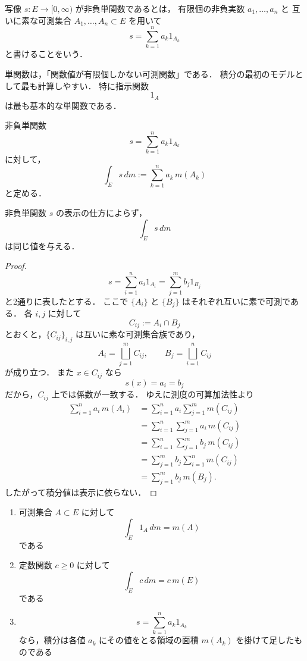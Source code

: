 \begin{definition}[非負単関数]
写像 $s:E \to [0,\infty)$ が非負単関数であるとは，
有限個の非負実数 $a_1,\dots,a_n$ と
互いに素な可測集合 $A_1,\dots,A_n \subset E$ を用いて
\[
s=\sum_{k=1}^n a_k 1_{A_k}
\]
と書けることをいう．
\end{definition}

\begin{remark}
単関数は，「関数値が有限個しかない可測関数」である．
積分の最初のモデルとして最も計算しやすい．
特に指示関数
\[
1_A
\]
は最も基本的な単関数である．
\end{remark}

\begin{definition}[単関数の積分]
非負単関数
\[
s=\sum_{k=1}^n a_k 1_{A_k}
\]
に対して，
\[
\int_E s\,dm
:=
\sum_{k=1}^n a_k\,m(A_k)
\]
と定める．
\end{definition}

\begin{proposition}
非負単関数 $s$ の表示の仕方によらず，
\[
\int_E s\,dm
\]
は同じ値を与える．
\end{proposition}
\begin{proof}
\[
s=\sum_{i=1}^n a_i 1_{A_i}
=
\sum_{j=1}^m b_j 1_{B_j}
\]
と2通りに表したとする．
ここで $\{A_i\}$ と $\{B_j\}$ はそれぞれ互いに素で可測である．
各 $i,j$ に対して
\[
C_{ij}:=A_i \cap B_j
\]
とおくと，$\{C_{ij}\}_{i,j}$ は互いに素な可測集合族であり，
\[
A_i=\bigsqcup_{j=1}^m C_{ij},
\qquad
B_j=\bigsqcup_{i=1}^n C_{ij}
\]
が成り立つ．
また $x \in C_{ij}$ なら
\[
s(x)=a_i=b_j
\]
だから，$C_{ij}$ 上では係数が一致する．
ゆえに測度の可算加法性より
\begin{align*}
\sum_{i=1}^n a_i\,m(A_i)
&=
\sum_{i=1}^n a_i \sum_{j=1}^m m(C_{ij}) \\
&=
\sum_{i=1}^n \sum_{j=1}^m a_i\,m(C_{ij}) \\
&=
\sum_{i=1}^n \sum_{j=1}^m b_j\,m(C_{ij}) \\
&=
\sum_{j=1}^m b_j \sum_{i=1}^n m(C_{ij}) \\
&=
\sum_{j=1}^m b_j\,m(B_j).
\end{align*}
したがって積分値は表示に依らない．
\end{proof}

\begin{example}
\begin{enumerate}
    \item 可測集合 $A \subset E$ に対して
    \[
    \int_E 1_A\,dm = m(A)
    \]
    である
    \item 定数関数 $c \ge 0$ に対して
    \[
    \int_E c\,dm = c\,m(E)
    \]
    である
    \item
    \[
    s=\sum_{k=1}^n a_k 1_{A_k}
    \]
    なら，積分は各値 $a_k$ にその値をとる領域の面積 $m(A_k)$ を掛けて足したものである
\end{enumerate}
\end{example}


